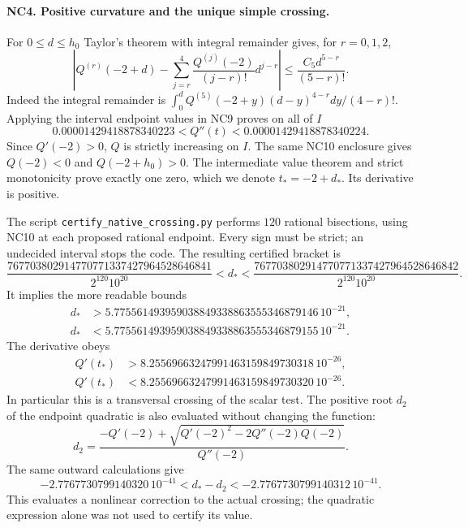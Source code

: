 \documentclass[11pt,a4paper]{article}
\theoremstyle{definition}\newtheorem{definition}[theorem]{Definition}
\begin{document}
\paragraph{NC4. Positive curvature and the unique simple crossing.}
For $0\le d\le h_0$ Taylor's theorem with integral remainder gives,
for $r=0,1,2$,
\[
 \left|Q^{(r)}(-2+d)-
 \sum_{j=r}^4\frac{Q^{(j)}(-2)}{(j-r)!}d^{j-r}\right|
 \le\frac{C_5d^{5-r}}{(5-r)!}.
 \tag{NC10}
\]
Indeed the integral remainder is
$\int_0^d Q^{(5)}(-2+y)(d-y)^{4-r}dy/(4-r)!$.
Applying the interval endpoint values in NC9 proves on all of $I$
\[
 0.00001429418878340223<Q''(t)
 <0.00001429418878340224.
 \tag{NC11}
\]
Since $Q'(-2)>0$, $Q$ is strictly increasing on $I$.
The same NC10 enclosure gives $Q(-2)<0$ and $Q(-2+h_0)>0$.
The intermediate value theorem and strict monotonicity prove exactly
one zero, which we denote $t_*=-2+d_*$. Its derivative is positive.

The script \texttt{certify\_native\_crossing.py} performs $120$
rational bisections, using NC10 at each proposed rational endpoint.
Every sign must be strict; an undecided interval stops the code.
The resulting certified bracket is
\[
 \frac{767703802914770771337427964528646841}
      {2^{120}10^{20}}
 <d_*<
 \frac{767703802914770771337427964528646842}
      {2^{120}10^{20}}.
 \tag{NC12}
\]
It implies the more readable bounds
\[
\begin{aligned}
d_*&>5.775561493959038849338863555346879146\,10^{-21},\\
d_*&<5.775561493959038849338863555346879155\,10^{-21}.
\end{aligned}\tag{NC13}
\]
The derivative obeys
\[
 \begin{aligned}
 Q'(t_*)&>8.25569663247991463159849730318\,10^{-26},\\
 Q'(t_*)&<8.25569663247991463159849730320\,10^{-26}.
 \end{aligned}
 \tag{NC14}
\]
In particular this is a transversal crossing of the scalar test.
The positive root $d_2$ of the endpoint quadratic is also evaluated
without changing the function:
\[
 d_2=\frac{-Q'(-2)+
 \sqrt{Q'(-2)^2-2Q''(-2)Q(-2)}}{Q''(-2)}.
 \tag{NC15}
\]
The same outward calculations give
\[
 -2.7767730799140320\,10^{-41}<d_*-d_2
 <-2.7767730799140312\,10^{-41}.
 \tag{NC16}
\]
This evaluates a nonlinear correction to the actual crossing;
the quadratic expression alone was not used to certify its value.
\end{document}
